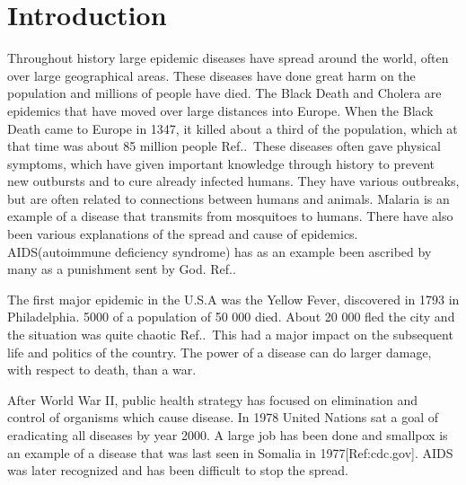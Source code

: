 \documentclass[%
twoside,                 %
final,                   %
chapterprefix=true,      %
open=right               %
10pt]{book}
\begin{document}




\chapter{Introduction}
Throughout history large epidemic diseases have spread around the world, often over large geographical areas. These diseases have done great harm on the population and millions of people have died. The Black Death and Cholera are epidemics that have moved over large distances into Europe. When the Black Death came to Europe in 1347, it killed about a third of the population, which at that time was about 85 million people Ref.\cite[p.~315]{murray2002mathematical}.~These diseases often gave physical symptoms, which have given important knowledge through history to prevent new outbursts and to cure already infected humans. They have various outbreaks, but are often related to connections between humans and animals. Malaria is an example of a disease that transmits from mosquitoes to humans. There have also been various explanations of the spread and cause of epidemics. AIDS(autoimmune deficiency syndrome) has as an example been ascribed by many as a punishment sent by God. Ref.\cite[p.~316]{murray2002mathematical}.~


\vspace{3mm}




\vspace{3mm}


The first major epidemic in the U.S.A was the Yellow Fever, discovered in 1793 in Philadelphia. 5000 of a population of 50 000 died. About 20 000 fled the city and the situation was quite chaotic Ref.\cite[p.~316]{murray2002mathematical}.~This had a major impact on the subsequent life and politics of the country. The power of a disease can do larger damage, with respect to death, than a war.


\vspace{3mm}




\vspace{3mm}


After World War II, public health strategy has focused on elimination and control of organisms which cause disease. In 1978 United Nations sat a goal of eradicating all diseases by year 2000. A large job has been done and smallpox is an example of a disease that was last seen in Somalia in 1977[Ref:cdc.gov]. AIDS was later recognized and has been difficult to stop the spread.
\end{document}
